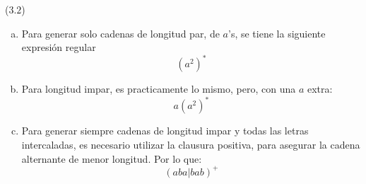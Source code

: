 \begin{mdframed}[style = warning]
	\begin{problem}
		($3.2$) 	
		\begin{enumerate}[a)]
			\item Para generar solo cadenas de longitud par, de $a$'s, se tiene la siguiente expresión regular
				$$(a^2)^*$$
			\item Para longitud impar, es practicamente lo mismo, pero, con una $a$ extra:
				$$a(a^2)^*$$
			\item Para generar siempre cadenas de longitud impar y todas las letras intercaladas, es necesario utilizar la clausura positiva, para asegurar la cadena alternante de menor longitud. Por lo que:
				$$(aba|bab)^+$$
		\end{enumerate}
	\end{problem}
\end{mdframed}











































